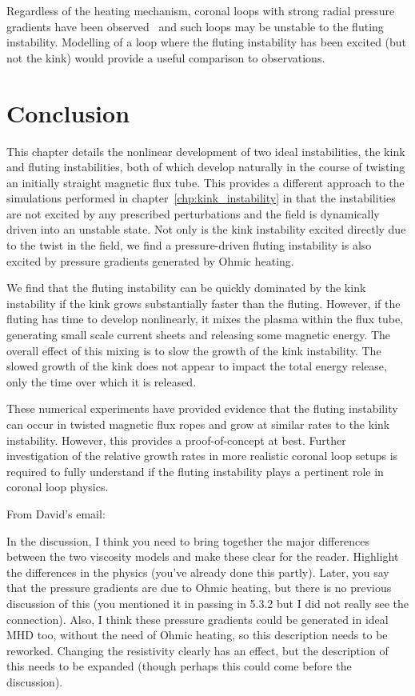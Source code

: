 Regardless of the heating mechanism, coronal loops with strong radial pressure gradients have been observed~\cite{foukalTemperatureStructurePressure1975} and such loops may be unstable to the fluting instability. Modelling of a loop where the fluting instability has been excited (but not the kink) would provide a useful comparison to observations.


\section{Conclusion}

This chapter details the nonlinear development of two ideal instabilities, the kink and fluting instabilities, both of which develop naturally in the course of twisting an initially straight magnetic flux tube. This provides a different approach to the simulations performed in chapter~\ref{chp:kink_instability} in that the instabilities are not excited by any prescribed perturbations and the field is dynamically driven into an unstable state. Not only is the kink instability excited directly due to the twist in the field, we find a pressure-driven fluting instability is also excited by pressure gradients generated by Ohmic heating.

We find that the fluting instability can be quickly dominated by the kink instability if the kink grows substantially faster than the fluting. However, if the fluting has time to develop nonlinearly, it mixes the plasma within the flux tube, generating small scale current sheets and releasing some magnetic energy. The overall effect of this mixing is to slow the growth of the kink instability. The slowed growth of the kink does not appear to impact the total energy release, only the time over which it is released. 

These numerical experiments have provided evidence that the fluting instability can occur in twisted magnetic flux ropes and grow at similar rates to the kink instability. However, this provides a proof-of-concept at best. Further investigation of the relative growth rates in more realistic coronal loop setups is required to fully understand if the fluting instability plays a pertinent role in coronal loop physics.

From David's email:

In the discussion, I think you need to bring together the major differences between the two viscosity models and make these clear for the reader. Highlight the differences in the physics (you've already done this partly). Later, you say that the pressure gradients are due to Ohmic heating, but there is no previous discussion of this (you mentioned it in passing in 5.3.2 but I did not really see the connection). Also, I think these pressure gradients could be generated in ideal MHD too, without the need of Ohmic heating, so this description needs to be reworked. Changing the resistivity clearly has an effect, but the description of this needs to be expanded (though perhaps this could come before the discussion). 
